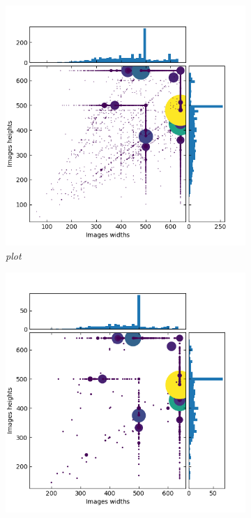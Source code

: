 \documentclass{article}
\begin{document}
        \begin{figure}[!ht]
            \begin{subfigure}{.49\linewidth}
                \centering
                \includegraphics[width=\linewidth]{pics/train2017full.png}
                \caption{\textit{plot}}
            \end{subfigure}
            \begin{subfigure}{.49\linewidth}
                \centering
                \includegraphics[width=\linewidth]{pics/val2017full.png}

\end{subfigure}
\end{figure}
\end{document}
